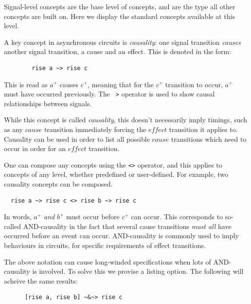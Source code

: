 \documentclass[british,conference,compsoc]{IEEEtran}
\begin{document}
Signal-level concepts are the base level of concepts, and are 
the type all other concepts are built on. Here we display the standard concepts
available at this level.

A key concept in asynchronous circuits is \emph{causality}:
one signal transition \emph{causes} another signal transition, a cause and an 
effect. This is denoted in the form: 

\begin{verbatim}
	    rise a ~> rise c
\end{verbatim}

\vspace{-1mm}

This is read as $a^{+}$ causes $c^{+}$, meaning that for the $c^{+}$ transition 
to occur, $a^{+}$ must have occurred previously. The 
\texttt{~>}
operator is used to show causal relationships between signals.
 
While this concept is called \emph{causality}, this doesn't necessarily imply
timings, such as any $\mathit{cause}$ transition immediately forcing the
 $\mathit{effect}$ transition it applies to. Causality can be used in order to
list all possible $\mathit{cause}$ transitions which need to occur in order
 for an $\mathit{effect}$ transition.

One can compose any concepts using the \texttt{<>} 
operator, and this applies
to concepts of any level, whether predefined or user-defined. For example, 
two causality concepts can be composed.

\begin{verbatim}
  rise a ~> rise c <> rise b ~> rise c
\end{verbatim}

In words, $a^{+}$ \emph{and} $b^{+}$ must occur before $c^{+}$ can occur. 
This corresponds to so-called AND-causality in the fact that several cause 
transitions \emph{must all} have occurred before an event can occur. 
AND-causality is commonly used to imply behaviours in circuits, for specific 
requirements of effect transitions.  

The above notation can cause long-winded specifications when lots of 
AND-causality is involved. To solve this we provise a listing option. The 
following will acheive the same results:

\begin{verbatim}
      [rise a, rise b] ~&~> rise c
\end{verbatim}
\end{document}
